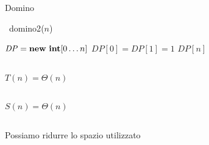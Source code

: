 \begin{frame}[fragile]{Domino}

\vspace{-9pt}
\begin{Procedure}
\caption[A]{\INTEGER\  \textsf{domino2}(\INTEGER $n$)}
  $\mathit{DP} = \NEW\ \INTEGER[0 \ldots n]$\;
  $\mathit{DP}[0] = \mathit{DP}[1] = 1$\;
  \Return $\mathit{DP}[n]$\;
\end{Procedure}

\begin{columns}[T]
\pause
{}
\bigskip
\alert{$T(n) = \Theta(n)$}
\end{columns}

\begin{columns}[T]
\pause
{}
\bigskip
\alert{$S(n) = \Theta(n)$}
\end{columns}

\begin{columns}[T]
\pause
{}
\bigskip
\alert{Possiamo ridurre lo spazio utilizzato}
\end{columns}

\end{frame}

